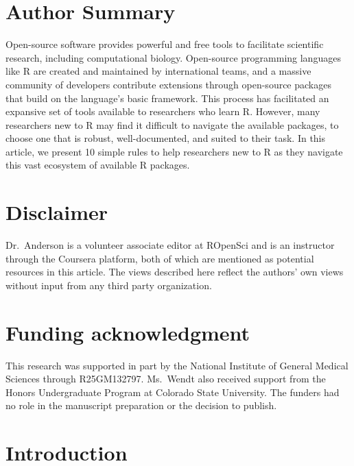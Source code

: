 \documentclass[10pt,letterpaper]{article}
\begin{document}
\linenumbers

\hypertarget{author-summary}{%
\section{Author Summary}\label{author-summary}}

Open-source software provides powerful and free tools to facilitate
scientific research, including computational biology. Open-source
programming languages like R are created and maintained by international
teams, and a massive community of developers contribute extensions
through open-source packages that build on the language's basic
framework. This process has facilitated an expansive set of tools
available to researchers who learn R. However, many researchers new to R
may find it difficult to navigate the available packages, to choose one
that is robust, well-documented, and suited to their task. In this
article, we present 10 simple rules to help researchers new to R as they
navigate this vast ecosystem of available R packages.

\hypertarget{disclaimer}{%
\section{Disclaimer}\label{disclaimer}}

Dr.~Anderson is a volunteer associate editor at ROpenSci and is an
instructor through the Coursera platform, both of which are mentioned as
potential resources in this article. The views described here reflect
the authors' own views without input from any third party organization.

\hypertarget{funding-acknowledgment}{%
\section{Funding acknowledgment}\label{funding-acknowledgment}}

This research was supported in part by the National Institute of General
Medical Sciences through R25GM132797. Ms.~Wendt also received support
from the Honors Undergraduate Program at Colorado State University. The
funders had no role in the manuscript preparation or the decision to
publish.

\hypertarget{introduction}{%
\section{Introduction}\label{introduction}}
\end{document}
